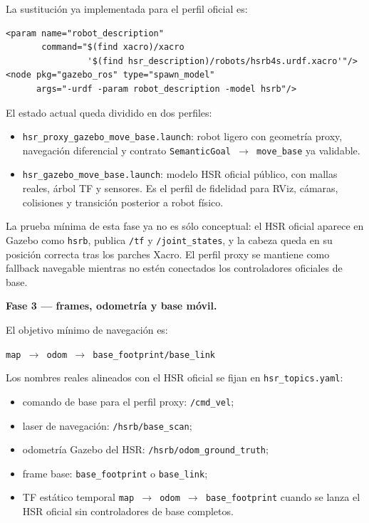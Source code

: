 \documentclass[11pt,a4paper]{article}
\begin{document}
La sustitución ya implementada para el perfil oficial es:

\begin{verbatim}
<param name="robot_description"
       command="$(find xacro)/xacro
                '$(find hsr_description)/robots/hsrb4s.urdf.xacro'"/>
<node pkg="gazebo_ros" type="spawn_model"
      args="-urdf -param robot_description -model hsrb"/>
\end{verbatim}

El estado actual queda dividido en dos perfiles:

\begin{itemize}
  \item \texttt{hsr\_proxy\_gazebo\_move\_base.launch}: robot ligero con
        geometría proxy, navegación diferencial y contrato
        \texttt{SemanticGoal $\rightarrow$ move\_base} ya validable.
  \item \texttt{hsr\_gazebo\_move\_base.launch}: modelo HSR oficial público,
        con mallas reales, árbol TF y sensores. Es el perfil de fidelidad para
        RViz, cámaras, colisiones y transición posterior a robot físico.
\end{itemize}

La prueba mínima de esta fase ya no es sólo conceptual: el HSR oficial aparece
en Gazebo como \texttt{hsrb}, publica \texttt{/tf} y \texttt{/joint\_states}, y
la cabeza queda en su posición correcta tras los parches Xacro. El perfil proxy
se mantiene como fallback navegable mientras no estén conectados los
controladores oficiales de base.

\textbf{Fase 3 --- frames, odometría y base móvil.}

El objetivo mínimo de navegación es:

\begin{center}
\texttt{map $\rightarrow$ odom $\rightarrow$ base\_footprint/base\_link}
\end{center}

Los nombres reales alineados con el HSR oficial se fijan en
\texttt{hsr\_topics.yaml}:

\begin{itemize}
  \item comando de base para el perfil proxy: \texttt{/cmd\_vel};
  \item laser de navegación: \texttt{/hsrb/base\_scan};
  \item odometría Gazebo del HSR: \texttt{/hsrb/odom\_ground\_truth};
  \item frame base: \texttt{base\_footprint} o \texttt{base\_link};
  \item TF estático temporal \texttt{map $\rightarrow$ odom $\rightarrow$
        base\_footprint} cuando se lanza el HSR oficial sin controladores de
        base completos.
\end{itemize}
\end{document}
